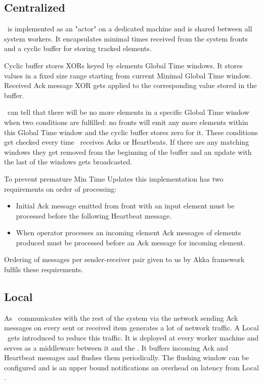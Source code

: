 \subsection{Centralized \tracker\ }

\tracker\ is implemented as an "actor" on a dedicated machine and is shared between all system workers. It encapsulates minimal times received from the system fronts and a cyclic buffer for storing tracked elements.

Cyclic buffer stores XORs keyed by elements Global Time windows. It stores values in a fixed size range starting from current Minimal Global Time window. Received Ack message XOR gets applied to the corresponding value stored in the buffer.

\tracker\ can tell that there will be no more elements in a specific Global Time window when two conditions are fulfilled: no fronts will emit any more elements within this Global Time window and the cyclic buffer stores zero for it. These conditions get checked every time \tracker\ receives Acks or Heartbeats. If there are any matching windows they get removed from the beginning of the buffer and an update with the last of the windows gets broadcasted.

To prevent premature Min Time Updates this implementation has two requirements on order of processing:

\begin{itemize}
	\item Initial Ack message emitted from front with an input element must be processed before the following Heartbeat message.
	\item When operator processes an incoming element Ack messages of elements produced must be processed before an Ack message for incoming element.
\end{itemize}

Ordering of messages per sender-receiver pair given to us by Akka framework fulfils these requirements.

\subsection{Local \tracker\ }

As \tracker\ communicates with the rest of the system via the network sending Ack messages on every sent or received item generates a lot of network traffic. A Local \tracker\ gets introduced to reduce this traffic. It is deployed at every worker machine and serves as a middleware between it and the \tracker. It buffers incoming Ack and Heartbeat messages and flushes them periodically. The flushing window can be configured and  is an upper bound notifications an overhead on latency from Local \tracker.

